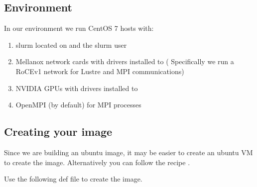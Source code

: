 \documentclass[letterpaper,10pt,english]{sphinxmanual}
\begin{document}
\subsection{Environment}
\label{\detokenize{appendix:environment}}
In our environment we run CentOS 7 hosts with:
\begin{enumerate}
\item {} 
slurm located on  and the slurm user 

\item {} 
Mellanox network cards with drivers installed to  ( Specifically we run a RoCEv1
network for Lustre and MPI communications)

\item {} 
NVIDIA GPUs with drivers installed to 

\item {} 
OpenMPI (by default) for MPI processes

\end{enumerate}


\subsection{Creating your image}
\label{\detokenize{appendix:creating-your-image}}
Since we are building an ubuntu image, it may be easier to create an ubuntu VM to create the image.
Alternatively you can follow the recipe .

Use the following def file to create the image.
\end{document}
